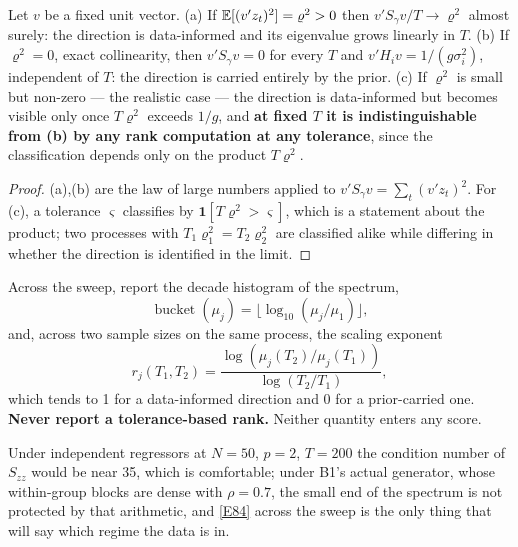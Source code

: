 \begin{proposition}\label{prop:rank}
Let $v$ be a fixed unit vector. (a) If $\mathbb{E}[(v'z_t)^2]=\varrho^2>0$ then
$v'S_\gamma v/T\to\varrho^2$ almost surely: the direction is data-informed and its
eigenvalue grows linearly in $T$. (b) If $\varrho^2=0$, exact collinearity, then
$v'S_\gamma v=0$ for every $T$ and $v'H_iv=1/(g\sigma_i^2)$, independent of $T$: the
direction is carried entirely by the prior. (c) If $\varrho^2$ is small but non-zero
--- the realistic case --- the direction is data-informed but becomes visible only
once $T\varrho^2$ exceeds $1/g$, and \textbf{at fixed $T$ it is indistinguishable from
(b) by any rank computation at any tolerance}, since the classification depends only
on the product $T\varrho^2$.
\end{proposition}

\begin{proof}
(a),(b) are the law of large numbers applied to $v'S_\gamma v=\sum_t(v'z_t)^2$. For
(c), a tolerance $\varsigma$ classifies by $\mathbf{1}[T\varrho^2>\varsigma]$, which
is a statement about the product; two processes with
$T_1\varrho_1^2=T_2\varrho_2^2$ are classified alike while differing in whether the
direction is identified in the limit.
\end{proof}

\begin{definition}\label{def:diag}
Across the sweep, report the decade histogram of the spectrum,
\begin{equation}
\operatorname{bucket}(\mu_j) = \bigl\lfloor\log_{10}(\mu_j/\mu_1)\bigr\rfloor,
\tag{E-83}\label{E83}
\end{equation}
and, across two sample sizes on the same process, the scaling exponent
\begin{equation}
r_j(T_1,T_2) = \frac{\log(\mu_j(T_2)/\mu_j(T_1))}{\log(T_2/T_1)},
\tag{E-84}\label{E84}
\end{equation}
which tends to 1 for a data-informed direction and 0 for a prior-carried one.
\textbf{Never report a tolerance-based rank.} Neither quantity enters any score.
\end{definition}

Under independent regressors at $N=50$, $p=2$, $T=200$ the condition number of
$S_{zz}$ would be near 35, which is comfortable; under B1's actual generator, whose
within-group blocks are dense with $\rho=0.7$, the small end of the spectrum is not
protected by that arithmetic, and \eqref{E84} across the sweep is the only thing that
will say which regime the data is in.


